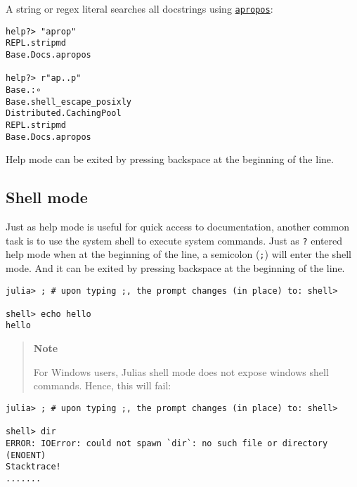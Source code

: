 A string or regex literal searches all docstrings using \hyperlink{6069714544176255543}{\texttt{apropos}}:




\begin{lstlisting}
help?> "aprop"
REPL.stripmd
Base.Docs.apropos

help?> r"ap..p"
Base.:∘
Base.shell_escape_posixly
Distributed.CachingPool
REPL.stripmd
Base.Docs.apropos
\end{lstlisting}



Help mode can be exited by pressing backspace at the beginning of the line.



\hypertarget{17654100848947676892}{}


\subsection{Shell mode}



Just as help mode is useful for quick access to documentation, another common task is to use the system shell to execute system commands. Just as \texttt{?} entered help mode when at the beginning of the line, a semicolon (\texttt{;}) will enter the shell mode. And it can be exited by pressing backspace at the beginning of the line.




\begin{verbatim}
julia> ; # upon typing ;, the prompt changes (in place) to: shell>

shell> echo hello
hello
\end{verbatim}



\begin{quote}
\textbf{Note}

For Windows users, Julia{\textquotesingle}s shell mode does not expose windows shell commands. Hence, this will fail:

\end{quote}



\begin{verbatim}
julia> ; # upon typing ;, the prompt changes (in place) to: shell>

shell> dir
ERROR: IOError: could not spawn `dir`: no such file or directory (ENOENT)
Stacktrace!
.......
\end{verbatim}



